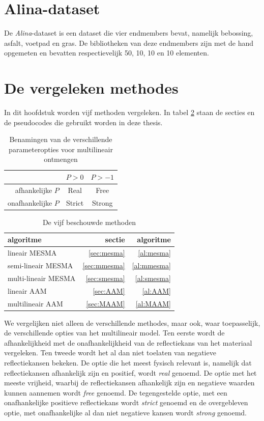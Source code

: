 \documentclass[12pt]{report}
\begin{document}
\section{Alina-dataset}

De \textit{Alina}-dataset is een dataset die vier endmembers bevat, namelijk bebossing, asfalt, voetpad en gras. De bibliotheken van deze endmembers zijn met de hand opgemeten en bevatten respectievelijk 50, 10, 10 en 10 elementen. 



\section{De vergeleken methodes}

In dit hoofdstuk worden vijf methoden vergeleken. In tabel \ref{tab:a} staan de secties en de pseudocodes die gebruikt worden  in deze thesis.  

\begin{table}
\Large\center
\begin{tabular}{r|c c}
&$P>0$&$P>-1$ \\
\hline
afhankelijke $P$ & Real & Free \\
onafhankelijke $P$ & Strict & Strong
\end{tabular}
\caption{Benamingen van de verschillende parameteropties voor multilineair ontmengen \label{tab:b}}
\end{table}


\begin{table}
\begin{tabular}{l r r}
algoritme & sectie & algoritme \\
\hline
lineair MESMA & \ref{sec:mesma} & \ref{al:mesma}\\
semi-lineair MESMA & \ref{sec:mmesma} &\ref{al:mmesma}\\
multi-lineair MESMA & \ref{sec:smesma} &\ref{al:smesma}\\
lineair AAM & \ref{sec:AAM}&\ref{al:AAM} \\
multilineair AAM & \ref{sec:MAAM} & \ref{al:MAAM} 
\end{tabular}
\caption{De vijf beschouwde methoden \label{tab:a}}
\end{table}


We vergelijken niet alleen de verschillende methodes, maar ook, waar toepasselijk, de verschillende opties van het multilineair model. Ten eerste wordt de afhankelijkheid met de onafhankelijkheid van de reflectiekans van het materiaal vergeleken. Ten tweede wordt het al dan niet toelaten van negatieve reflectiekansen bekeken. De optie die het meest fysisch relevant is, namelijk dat reflectiekansen afhankelijk zijn en positief, wordt \textit{real} genoemd. De optie met het meeste vrijheid, waarbij de reflectiekansen afhankelijk zijn en negatieve waarden kunnen aannemen wordt \textit{free} genoemd. De tegengestelde optie, met een onafhankelijke positieve reflectiekans wordt \textit{strict} genoemd en de overgebleven optie, met onafhankelijke al dan niet negatieve kansen wordt \textit{strong} genoemd. 
\end{document}

